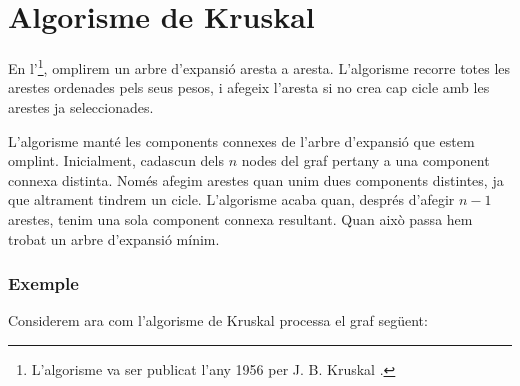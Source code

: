 \section{Algorisme de Kruskal}


En l'\footnote{L'algorisme va ser publicat
l'any 1956 per J. B. Kruskal \cite{kru56}.}, omplirem un arbre
d'expansió aresta a aresta. L'algorisme recorre totes les arestes
ordenades pels seus pesos, i afegeix l'aresta si no crea cap cicle amb
les arestes ja seleccionades.

L'algorisme manté les components connexes de l'arbre d'expansió que
estem omplint. Inicialment, cadascun dels $n$ nodes del graf pertany a
una component connexa distinta. Només afegim arestes quan unim dues
components distintes, ja que altrament tindrem un cicle. L'algorisme
acaba quan, després d'afegir $n-1$ arestes, tenim una sola component
connexa resultant. Quan això passa hem trobat un arbre d'expansió
mínim.

\subsubsection{Exemple}


\begin{samepage}
Considerem ara com l'algorisme de Kruskal processa el graf següent:
\begin{center}
\end{center}
\end{samepage}

